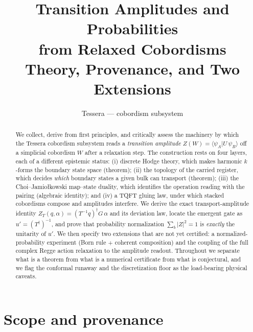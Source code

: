 \documentclass[11pt]{article}
\title{\bfseries Transition Amplitudes and Probabilities\\ from Relaxed Cobordisms\\[4pt]
\large Theory, Provenance, and Two Extensions}
\author{Tessera --- cobordism subsystem}
\date{}
\newcommand{\braket}[2]{\langle #1 \vert #2 \rangle}
\newcommand{\abs}[1]{\lvert #1 \rvert}
\newcommand{\ZT}{Z_{T}}
\theoremstyle{plain}
\theoremstyle{definition}
\begin{document}
\maketitle

\begin{abstract}
\noindent
We collect, derive from first principles, and critically assess the machinery by which
the Tessera cobordism subsystem reads a \emph{transition amplitude}
$Z(W)=\braket{\psi_A}{U\,\psi_B}$ off a simplicial cobordism $W$ after a relaxation
step. The construction rests on four layers, each of a different epistemic status:
(i) discrete Hodge theory, which makes harmonic $k$-forms the boundary state space
(theorem); (ii) the topology of the carried register, which decides \emph{which} boundary
states a given bulk can transport (theorem); (iii) the Choi--Jamio\l{}kowski map--state
duality, which identifies the operation reading with the pairing (algebraic identity);
and (iv) a TQFT gluing law, under which stacked cobordisms compose and amplitudes
interfere. We derive the exact transport-amplitude identity
$\ZT(q,\alpha)=(T^{-1}q)^\dagger G\,\alpha$ and its deviation law, locate the emergent
gate as $u'=(T^\dagger)^{-1}$, and prove that probability normalization
$\sum_b\abs{Z}^2=1$ is \emph{exactly} the unitarity of $u'$. We then specify two
extensions that are not yet certified: a normalized-probability experiment (Born rule
$+$ coherent composition) and the coupling of the full complex Regge action relaxation to
the amplitude readout. Throughout we separate what is a theorem from what is a numerical
certificate from what is conjectural, and we flag the conformal runaway and the
discretization floor as the load-bearing physical caveats.
\end{abstract}

\tableofcontents
\bigskip

\section{Scope and provenance}
\label{sec:scope}
\end{document}

